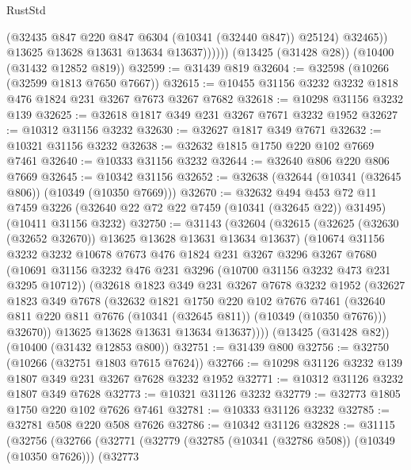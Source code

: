 \begin{lexlean}{RustStd}
\begin{coremodule}
                    (@32435 @847 @220 @847 @6304 (@10341 (@32440 @847)) @25124)
                    @32465))
                @13625
                @13628
                @13631
                @13634
                @13637))))))
    (@13425 (@31428 @28))
    (@10400 (@31432 @12852 @819))
@32599 := @31439 @819
@32604 := @32598 (@10266 (@32599 @1813 @7650 @7667))
@32615 := @10455 @31156 @3232 @3232 @1818 @476 @1824 @231 @3267 @7673 @3267 @7682
@32618 := @10298 @31156 @3232 @139
@32625 := @32618 @1817 @349 @231 @3267 @7671 @3232 @1952
@32627 := @10312 @31156 @3232
@32630 := @32627 @1817 @349 @7671
@32632 := @10321 @31156 @3232
@32638 := @32632 @1815 @1750 @220 @102 @7669 @7461
@32640 := @10333 @31156 @3232
@32644 := @32640 @806 @220 @806 @7669
@32645 := @10342 @31156
@32652 := @32638 (@32644 (@10341 (@32645 @806)) (@10349 (@10350 @7669)))
@32670 := @32632
    @494
    @453
    @72
    @11
    @7459
    @3226
    (@32640 @22 @72 @22 @7459 (@10341 (@32645 @22)) @31495)
    (@10411 @31156 @3232)
@32750 := @31143
    (@32604
      (@32615
        (@32625 (@32630 (@32652 @32670)) @13625 @13628 @13631 @13634 @13637)
        (@10674
          @31156
          @3232
          @3232
          @10678
          @7673
          @476
          @1824
          @231
          @3267
          @3296
          @3267
          @7680
          (@10691 @31156 @3232 @476 @231 @3296 (@10700 @31156 @3232 @473 @231 @3295 @10712))
          (@32618
            @1823
            @349
            @231
            @3267
            @7678
            @3232
            @1952
            (@32627
              @1823
              @349
              @7678
              (@32632
                @1821
                @1750
                @220
                @102
                @7676
                @7461
                (@32640 @811 @220 @811 @7676 (@10341 (@32645 @811)) (@10349 (@10350 @7676)))
                @32670))
            @13625
            @13628
            @13631
            @13634
            @13637))))
    (@13425 (@31428 @82))
    (@10400 (@31432 @12853 @800))
@32751 := @31439 @800
@32756 := @32750 (@10266 (@32751 @1803 @7615 @7624))
@32766 := @10298 @31126 @3232 @139 @1807 @349 @231 @3267 @7628 @3232 @1952
@32771 := @10312 @31126 @3232 @1807 @349 @7628
@32773 := @10321 @31126 @3232
@32779 := @32773 @1805 @1750 @220 @102 @7626 @7461
@32781 := @10333 @31126 @3232
@32785 := @32781 @508 @220 @508 @7626
@32786 := @10342 @31126
@32828 := @31115
    (@32756
      (@32766
        (@32771
          (@32779
            (@32785 (@10341 (@32786 @508)) (@10349 (@10350 @7626)))
            (@32773

\end{coremodule}
\end{lexlean}

